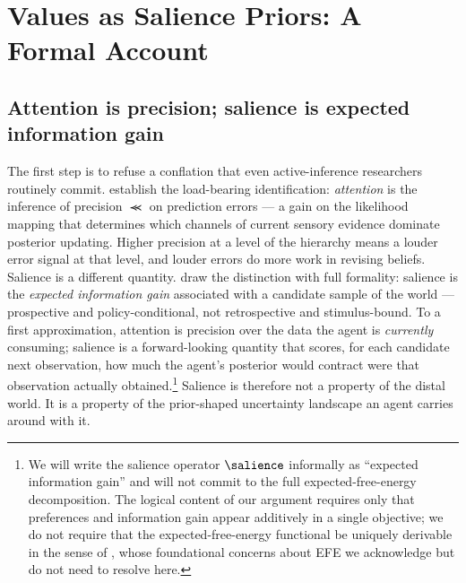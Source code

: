 \section{Values as Salience Priors: A Formal Account}\label{sec:formal}


\subsection{Attention is precision; salience is expected information gain}
\label{sec:attention-vs-salience}

The first step is to refuse a conflation that even active-inference researchers
routinely commit. \citet{feldmanFriston2010Attention} establish the load-bearing
identification: \emph{attention} is the inference of precision $\Prec$ on
prediction errors --- a gain on the likelihood mapping that determines which
channels of current sensory evidence dominate posterior updating. Higher
precision at a level of the hierarchy means a louder error signal at that
level, and louder errors do more work in revising beliefs. Salience is a
different quantity. \citet{parrFriston2017Attention,parrFriston2019AdvancedAtt}
draw the distinction with full formality: salience is the \emph{expected
information gain} associated with a candidate sample of the world ---
prospective and policy-conditional, not retrospective and stimulus-bound. To a
first approximation, attention is precision over the data the agent is
\emph{currently} consuming; salience is a forward-looking quantity that scores,
for each candidate next observation, how much the agent's posterior would
contract were that observation actually obtained.\footnote{We will write the
salience operator $\salience$ informally as ``expected information gain'' and
will not commit to the full expected-free-energy decomposition. The logical
content of our argument requires only that preferences and information gain
appear additively in a single objective; we do not require that the
expected-free-energy functional be uniquely derivable in the sense of
\citet{millidge2021EFE}, whose foundational concerns about EFE we acknowledge
but do not need to resolve here.} Salience is therefore not a property of the
distal world. It is a property of the prior-shaped uncertainty landscape an
agent carries around with it.

